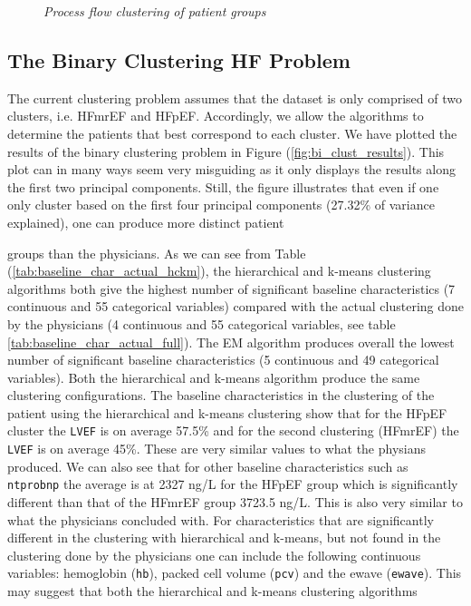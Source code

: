 \documentclass[../thesis.tex]{subfiles}
\begin{document}
\begin{figure}
    \centering
    
    \caption[Process flow clustering of patient groups]{\textit{Process flow clustering of patient groups}}
    \label{fig:process_flow_clustering}
\end{figure}

\subsection{The Binary Clustering HF Problem}
\label{subsec:bi_clust}

The current clustering problem assumes that the dataset is only comprised of two clusters, i.e. HFmrEF and HFpEF. Accordingly, we allow the algorithms to determine the patients that best correspond to each cluster. We have plotted the results of the binary clustering problem in Figure (\ref{fig:bi_clust_results}). This plot can in many ways seem very misguiding as it only displays the results along the first two principal components. Still, the figure illustrates that even if one only cluster based on the first four principal components (27.32\% of variance explained), one can produce more distinct patient     





\noindent groups than the physicians. As we can see from Table (\ref{tab:baseline_char_actual_hckm}), the hierarchical and k-means clustering algorithms both give the highest number of significant baseline characteristics (7 continuous and 55 categorical variables) compared with the actual clustering done by the physicians (4 continuous and 55 categorical variables, see table \ref{tab:baseline_char_actual_full}). The EM algorithm produces overall the lowest number of significant baseline characteristics (5 continuous and 49 categorical variables). Both the hierarchical and k-means algorithm produce the same clustering configurations. The baseline characteristics in the clustering of the patient using the hierarchical and k-means clustering show that for the HFpEF cluster the \texttt{LVEF} is on average 57.5\% and for the second clustering (HFmrEF) the \texttt{LVEF} is on average 45\%. These are very similar values to what the physians produced. We can also see that for other baseline characteristics such as \texttt{ntprobnp} the average is at 2327 ng/L for the HFpEF group which is significantly different than that of the HFmrEF group 3723.5 ng/L. This is also very similar to what the physicians concluded with. For characteristics that are significantly different in the clustering with hierarchical and k-means, but not found in the clustering done by the physicians one can include the following continuous variables: hemoglobin (\texttt{hb}), packed cell volume (\texttt{pcv}) and the ewave (\texttt{ewave}). This may suggest that both the hierarchical and k-means clustering algorithms    
\end{document}
